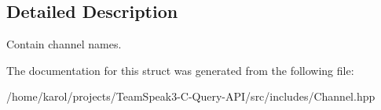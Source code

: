 \subsection{Detailed Description}
Contain channel names. 

The documentation for this struct was generated from the following file\+:\begin{DoxyCompactItemize}
\item 
/home/karol/projects/\+Team\+Speak3-\/\+C-\/\+Query-\/\+A\+P\+I/src/includes/Channel.\+hpp\end{DoxyCompactItemize}
